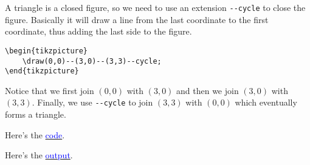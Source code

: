 \documentclass{book}
\begin{document}
A triangle is a closed figure, so we need to use an extension \lstinline|--cycle| to close the figure. Basically it will draw a line from the last coordinate to the first coordinate, thus adding the last side to the figure.

\begin{lstlisting}[frame=tlBR, breaklines=true, caption=Draw a triangle, label=lst:lst4]
\begin{tikzpicture}
	\draw(0,0)--(3,0)--(3,3)--cycle;
\end{tikzpicture}
\end{lstlisting}

Notice that we first join $(0,0)$ with $(3,0)$ and then we join $(3,0)$ with $(3,3)$. Finally, we use \lstinline|--cycle| to join $(3,3)$ with $(0,0)$ which eventually forms a triangle.

Here's the \href{https://github.com/0x50-0x42/latex/blob/LaTeX/Tikz/codes/triangle.tex}{\textcolor{blue}{code}}.

Here's the \href{https://github.com/0x50-0x42/latex/blob/LaTeX/Tikz/codes/triangle.pdf}{\textcolor{blue}{output}}.
\end{document}
